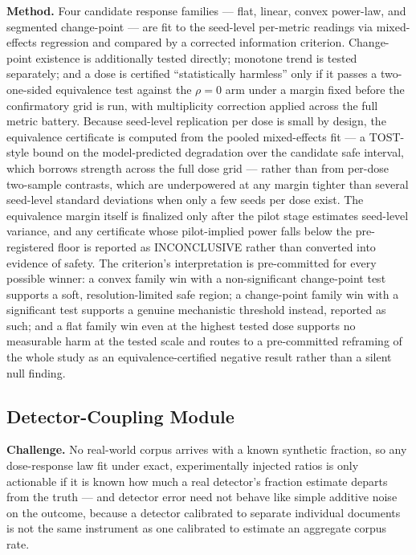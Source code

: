\documentclass[11pt]{article}
\begin{document}
\textbf{Method.} Four candidate response families --- flat, linear, convex power-law, and segmented change-point --- are fit to the seed-level per-metric readings via mixed-effects regression and compared by a corrected information criterion. Change-point existence is additionally tested directly; monotone trend is tested separately; and a dose is certified ``statistically harmless'' only if it passes a two-one-sided equivalence test against the $\rho = 0$ arm under a margin fixed before the confirmatory grid is run, with multiplicity correction applied across the full metric battery. Because seed-level replication per dose is small by design, the equivalence certificate is computed from the pooled mixed-effects fit --- a TOST-style bound on the model-predicted degradation over the candidate safe interval, which borrows strength across the full dose grid --- rather than from per-dose two-sample contrasts, which are underpowered at any margin tighter than several seed-level standard deviations when only a few seeds per dose exist. The equivalence margin itself is finalized only after the pilot stage estimates seed-level variance, and any certificate whose pilot-implied power falls below the pre-registered floor is reported as INCONCLUSIVE rather than converted into evidence of safety. The criterion's interpretation is pre-committed for every possible winner: a convex family win with a non-significant change-point test supports a soft, resolution-limited safe region; a change-point family win with a significant test supports a genuine mechanistic threshold instead, reported as such; and a flat family win even at the highest tested dose supports no measurable harm at the tested scale and routes to a pre-committed reframing of the whole study as an equivalence-certified negative result rather than a silent null finding.

\subsection{Detector-Coupling Module}
\textbf{Challenge.} No real-world corpus arrives with a known synthetic fraction, so any dose-response law fit under exact, experimentally injected ratios is only actionable if it is known how much a real detector's fraction estimate departs from the truth --- and detector error need not behave like simple additive noise on the outcome, because a detector calibrated to separate individual documents is not the same instrument as one calibrated to estimate an aggregate corpus rate.
\end{document}
